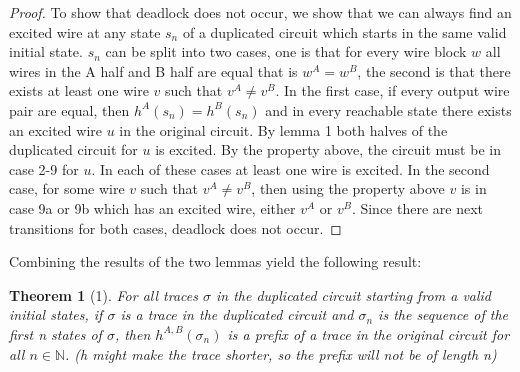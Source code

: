 \documentclass{article}
\newtheorem*{theorem}{Theorem}
\begin{document}
\begin{proof}
To show that deadlock does not occur, we show that we can always find an excited wire at any state $s_n$ of a duplicated circuit which starts in the same valid initial state.  $s_n$ can be split into two cases, one is that for every wire block $w$ all wires in the A half and B half are equal that is $w^A=w^B$, the second is that there exists at least one wire $v$ such that $v^A\neq v^B$.  In the first case, if every output wire pair are equal, then $h^A(s_n)=h^B(s_n)$ and in every reachable state there exists an excited wire $u$ in the original circuit.  By lemma 1 both halves of the duplicated circuit for $u$ is excited.  By the property above, the circuit must be in case 2-9 for $u$.  In each of these cases at least one wire is excited.  \newline
In the second case, for some wire $v$ such that $v^A\neq v^B$, then using the property above $v$ is in case 9a or 9b which has an excited wire, either $v^A$ or $v^B$.  Since there are next transitions for both cases, deadlock does not occur.
\end{proof}


Combining the results of the two lemmas yield the following result:
\begin{theorem}[1]
For all traces $\sigma$ in the duplicated circuit starting from a valid initial states, if $\sigma$ is a trace in the duplicated circuit and $\sigma_n$ is the sequence of the first n states of $\sigma$, then $h^{A,B}(\sigma_n)$ is a prefix of a trace in the original circuit for all $n \in \mathbb{N}$.  (h might make the trace shorter, so the prefix will not be of length n)
\end{theorem}

\end{document}
